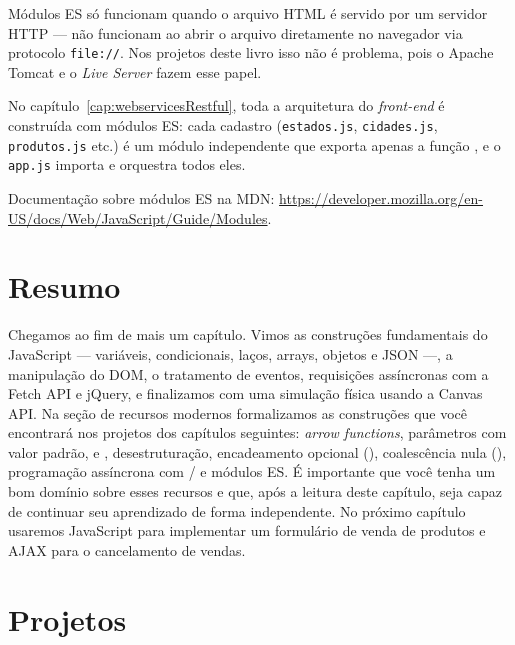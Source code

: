 \begin{atencao}
    Módulos ES só funcionam quando o arquivo HTML é servido por um servidor HTTP --- não funcionam ao abrir o arquivo diretamente no navegador via protocolo \texttt{file://}. Nos projetos deste livro isso não é problema, pois o Apache Tomcat e o \textit{Live Server} fazem esse papel.
\end{atencao}

No capítulo~\ref{cap:webservicesRestful}, toda a arquitetura do \textit{front-end} é construída com módulos ES: cada cadastro (\texttt{estados.js}, \texttt{cidades.js}, \texttt{produtos.js} etc.) é um módulo independente que exporta apenas a função , e o \texttt{app.js} importa e orquestra todos eles.

\begin{saibaMais}
    Documentação sobre módulos ES na MDN: \url{https://developer.mozilla.org/en-US/docs/Web/JavaScript/Guide/Modules}.
\end{saibaMais}



\section{Resumo}

Chegamos ao fim de mais um capítulo. Vimos as construções fundamentais do JavaScript --- variáveis, condicionais, laços, arrays, objetos e JSON ---, a manipulação do DOM, o tratamento de eventos, requisições assíncronas com a Fetch API e jQuery, e finalizamos com uma simulação física usando a Canvas API. Na seção de recursos modernos formalizamos as construções que você encontrará nos projetos dos capítulos seguintes: \textit{arrow functions}, parâmetros com valor padrão,  e , desestruturação, encadeamento opcional (), coalescência nula (), programação assíncrona com / e módulos ES. É importante que você tenha um bom domínio sobre esses recursos e que, após a leitura deste capítulo, seja capaz de continuar seu aprendizado de forma independente. No próximo capítulo usaremos JavaScript para implementar um formulário de venda de produtos e AJAX para o cancelamento de vendas.



\section{Projetos}


